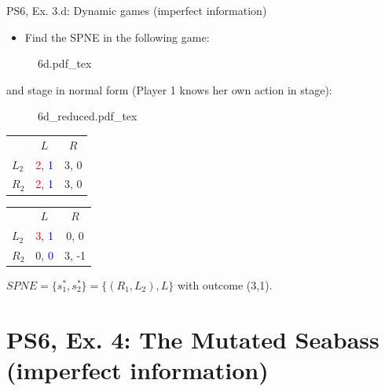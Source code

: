 \begin{frame}{PS6, Ex. 3.d: Dynamic games (imperfect information)}
    \begin{itemize}
      \item[(d)] Find the SPNE in the following game:
    \end{itemize}
    \vspace{-4pt}
    \begin{figure}[!h]
      \center
      \def\svgwidth{.8\columnwidth}
      {6d.pdf_tex}
    \end{figure}
    \vspace{-4pt}
     and  stage in normal form (Player 1 knows her own action in  stage):
    \vspace{-4pt}
    \begin{figure}[!h]
      \center
      \def\svgwidth{.25\columnwidth}
      {6d_reduced.pdf_tex}
    \end{figure}
    \vspace{-9pt}
    \begin{table}
      \begin{tabular}{l|c|c|}
        \multicolumn{1}{c}{} & \multicolumn{1}{c}{\color{blue}$L$} & \multicolumn{1}{c}{$R$} \\\cline{2-3}
        $L_2$ & \textcolor{red}{2}, \textcolor{blue}{1} & 3, 0 \\\cline{2-3}
        $R_2$ & \textcolor{red}{2}, \textcolor{blue}{1} & 3, 0 \\\cline{2-3}
      \end{tabular}
      \enskip
      \begin{tabular}{l|c|c|}
        \multicolumn{1}{c}{} & \multicolumn{1}{c}{\color{blue}$L$} & \multicolumn{1}{c}{$R$} \\\cline{2-3}
        $L_2$ & \textcolor{red}{3}, \textcolor{blue}{1} & 0, 0 \\\cline{2-3}
        $R_2$ & 0, \textcolor{blue}{0} & 3, -1 \\\cline{2-3}
      \end{tabular}
    \end{table}
    \vspace{-4pt}
    $SPNE=\{s_1^{*},s_2^{*}\}=\{(R_1,L_2),L\}$ with outcome (3,1).
    \vfill\null
\end{frame}



\section{PS6, Ex. 4: The Mutated Seabass (imperfect information)}

